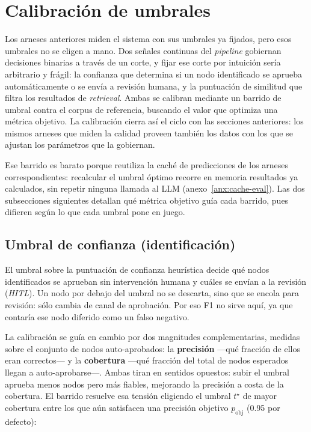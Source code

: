 \section{Calibración de umbrales}

Los arneses anteriores miden el sistema con sus umbrales ya fijados, pero esos umbrales no se
eligen a mano. Dos señales continuas del \textit{pipeline} gobiernan decisiones binarias a través
de un corte, y fijar ese corte por intuición sería arbitrario y frágil: la confianza que determina
si un nodo identificado se aprueba automáticamente o se envía a revisión humana, y la puntuación de
similitud que filtra los resultados de \textit{retrieval}. Ambas se calibran mediante un barrido de
umbral contra el corpus de referencia, buscando el valor que optimiza una métrica objetivo. La
calibración cierra así el ciclo con las secciones anteriores: los mismos arneses que miden la
calidad proveen también los datos con los que se ajustan los parámetros que la gobiernan.

Ese barrido es barato porque reutiliza la caché de predicciones de los arneses correspondientes:
recalcular el umbral óptimo recorre en memoria resultados ya calculados, sin repetir ninguna llamada
al LLM (anexo~\ref{anx:cache-eval}). Las dos subsecciones siguientes detallan qué métrica objetivo
guía cada barrido, pues difieren según lo que cada umbral pone en juego.

\subsection{Umbral de confianza (identificación)}

El umbral sobre la puntuación de confianza heurística decide qué nodos identificados se aprueban
sin intervención humana y cuáles se envían a la revisión (\textit{HITL}). Un nodo por debajo del
umbral no se descarta, sino que se encola para revisión: sólo cambia de canal de aprobación. Por eso
F1 no sirve aquí, ya que contaría ese nodo diferido como un falso negativo.

La calibración se guía en cambio por dos magnitudes complementarias, medidas sobre el conjunto de
nodos auto-aprobados: la \textbf{precisión} —qué fracción de ellos eran correctos— y la
\textbf{cobertura} —qué fracción del total de nodos esperados llegan a auto-aprobarse—. Ambas
tiran en sentidos opuestos: subir el umbral aprueba menos nodos pero más fiables, mejorando la
precisión a costa de la cobertura. El barrido resuelve esa tensión eligiendo el umbral $t^\star$ de
mayor cobertura entre los que aún satisfacen una precisión objetivo $p_{\text{obj}}$ (0.95 por
defecto):

